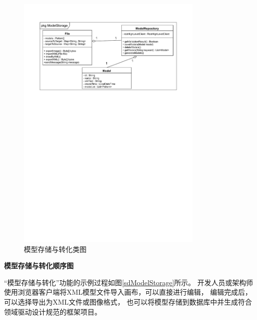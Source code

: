 \begin{figure}[!htbp] %
    \centering %
    \includegraphics[width=0.8\textwidth]{FIGs/chapter4/classModelStorage1.pdf} %
    \caption{模型存储与转化类图} %
    \label{classModelStorage} %
\end{figure}%

\newpage
\textbf{模型存储与转化顺序图}

“模型存储与转化”功能的示例过程如图\ref{sdModelStorage}所示。
开发人员或架构师使用浏览器客户端将XML模型文件导入画布，可以直接进行编辑，
编辑完成后，可以选择导出为XML文件或图像格式，
也可以将模型存储到数据库中并生成符合领域驱动设计规范的框架项目。

